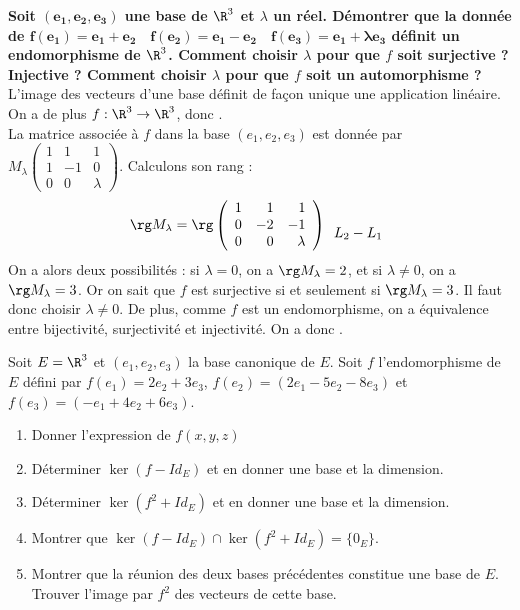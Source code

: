 \documentclass[a4paper, 11pt,reqno]{article}
\begin{document}
\begin{correction}  \;
	\textbf{Soit $\mathbf{(e_1,e_2,e_3)}$ une base de $\R^3$ et $\lambda$ un r\'eel. D\'emontrer que la donn\'ee de
		$\mathbf{f(e_1)=e_1+e_2\quad f(e_2)=e_1-e_2\quad f(e_3)=e_1+\lambda e_3}$
		d\'efinit un endomorphisme de $\R^3$. Comment choisir $\lambda$ pour que $f$ soit surjective ? Injective ? Comment choisir $\lambda$ pour que $f$ soit un automorphisme ? }\\
	L'image des vecteurs d'une base d\'efinit de fa\c con unique une application lin\'eaire. On a de plus $f : \R^3 \to \R^3$, donc .\\
	La matrice associ\'ee \`a $f$ dans la base $(e_1,e_2,e_3)$ est donn\'ee par $M_\lambda \left(\begin{array}{rrr} 1 & 1 & 1 \\1 & -1 & 0\\0 & 0 &\lambda\end{array}\right)$. Calculons son rang :
	$$\rg M_\lambda = \rg \left(\begin{array}{rrr} 1 & 1 & 1 \\0 & -2 & -1\\0 & 0 &\lambda\end{array}\right) \begin{array}{l} \\ L_2-L_1\\\end{array}$$
	On a alors deux possibilit\'es : si $\lambda =0$, on a $\rg M_\lambda = 2$, et si $\lambda\not =0$, on a $\rg M_\lambda = 3$. Or on sait que $f$ est surjective si et seulement si $\rg M_\lambda = 3$. Il faut donc choisir $\lambda\not=0$. De plus, comme $f$ est un endomorphisme, on a \'equivalence entre bijectivit\'e, surjectivit\'e et injectivit\'e. On a donc .
\end{correction}
\begin{exercice}  \;
	Soit $E=\R^3$ et $(e_1,e_2,e_3)$ la base canonique de $E$. Soit $f$ l'endomorphisme de $E$ d\'efini par $f(e_1)=2e_2+3e_3$, $f(e_2)=(2e_1-5e_2-8e_3)$ et $f(e_3)=(-e_1+4e_2+6e_3)$.
	\begin{enumerate}
		\item Donner l'expression de $f(x,y,z)$
		\item D\'eterminer $\ker (f-Id_E)$ et en donner une base et la dimension.
		\item D\'eterminer $\ker (f^2+Id_E)$ et en donner une base et la dimension.
		\item Montrer que $\ker (f-Id_E)\cap \ker (f^2+Id_E)=\lbrace 0_E\rbrace$.
		\item Montrer que la r\'eunion des deux bases pr\'ec\'edentes constitue une base de $E$. Trouver l'image par $f^2$ des vecteurs de cette base.
	\end{enumerate}
\end{exercice}
\end{document}
